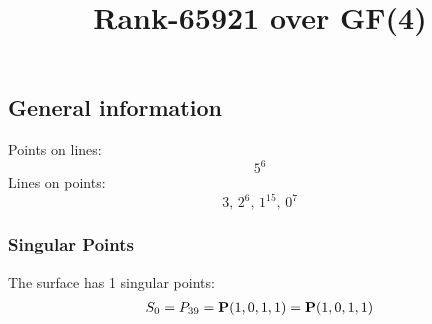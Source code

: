 \documentclass{article}
\newcommand\setTBstruts{\def\T{\rule{0pt}{2.6ex}}%
\def\B{\rule[-1.2ex]{0pt}{0pt}}}
\newcommand{\bP}{{\bf P}}
\begin{document}
 
\setTBstruts



{\allowdisplaybreaks%






\title{Rank-65921 over GF(4)}
\author{}%
\maketitle%
%
{}



\subsection*{General information}
Points on lines:
$$
5^6$$
Lines on points:
$$
3,\,2^6,\,1^{15},\,0^7$$
\subsubsection*{Singular Points}
The surface has 1 singular points:\\
\begin{align*}
S_{0} &= P_{39}=\bP(1, 0, 1, 1) = \bP(1, 0, 1, 1)\\
\end{align*}
}
\end{document}
